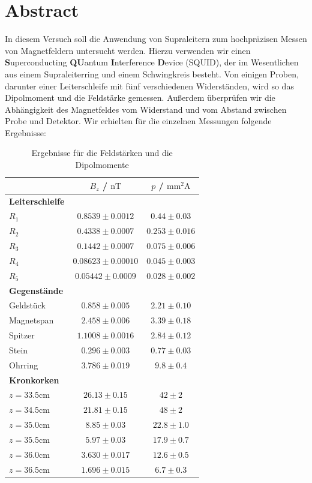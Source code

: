 \documentclass[12pt]{article}
\title{\vspace{0cm}{\Huge Fortgeschrittenen-Praktikum I:\\ \vspace{1cm} SQUID}}
\author{Saskia Bondza\\Simon Stephan}
\date{durchgeführt am 23.09.2016}
\begin{document}
\maketitle
\newpage

\section*{Abstract}

In diesem Versuch soll die Anwendung von Supraleitern zum hochpräzisen  Messen von Magnetfeldern untersucht werden. Hierzu verwenden wir einen \textbf{S}uperconducting \textbf{QU}antum \textbf{I}nterference \textbf{D}evice (SQUID), der im Wesentlichen aus einem Supraleiterring und einem Schwingkreis besteht. Von einigen Proben, darunter einer Leiterschleife mit fünf verschiedenen Widerständen, wird so das Dipolmoment und die Feldstärke gemessen. Außerdem überprüfen wir die Abhängigkeit des Magnetfeldes vom Widerstand und vom Abstand zwischen Probe und Detektor.
Wir erhielten für die einzelnen Messungen folgende Ergebnisse:

\begin{table}[h!]
	\centering
	\begin{tabular}{l|c|c}
		&$B_z$ / $\mathrm{nT}$&$p$ / $\mathrm{mm^2A}$\\\hline\hline
		\textbf{Leiterschleife}&&\\\hline
		$R_1$&$0.8539\pm0.0012$&$0.44\pm0.03$\\\hline
		$R_2$&$0.4338\pm0.0007$&$0.253\pm0.016$\\\hline
		$R_3$&$0.1442\pm0.0007$&$0.075\pm0.006$\\\hline
		$R_4$&$0.08623\pm0.00010$&$0.045\pm0.003$\\\hline
		$R_5$&$0.05442\pm0.0009$&$0.028\pm0.002$\\\hline\hline
		\textbf{Gegenstände}&&\\\hline
		Geldstück&$0.858\pm0.005$&$2.21\pm0.10$\\\hline
		Magnetspan&$2.458\pm0.006$&$3.39\pm0.18$\\\hline
		Spitzer&$1.1008\pm0.0016$&$2.84\pm0.12$\\\hline
		Stein&$0.296\pm0.003$&$0.77\pm0.03$\\\hline
		Ohrring&$3.786\pm0.019$&$9.8\pm0.4$\\\hline\hline
		\textbf{Kronkorken}&&\\\hline
		$z=33.5\mathrm{cm}$&$26.13 \pm0.15 $&$42  \pm2  $\\\hline
		$z=34.5\mathrm{cm}$&$21.81 \pm0.15 $&$48  \pm2  $\\\hline
		$z=35.0\mathrm{cm}$&$ 8.85 \pm0.03 $&$22.8\pm1.0$\\\hline
		$z=35.5\mathrm{cm}$&$ 5.97 \pm0.03 $&$17.9\pm0.7$\\\hline
		$z=36.0\mathrm{cm}$&$ 3.630\pm0.017$&$12.6\pm0.5$\\\hline
		$z=36.5\mathrm{cm}$&$ 1.696\pm0.015$&$ 6.7\pm0.3$
	\end{tabular}
	\caption{Ergebnisse für die Feldstärken und die Dipolmomente\label{ergebnisseAbstract}}
\end{table}
\end{document}
